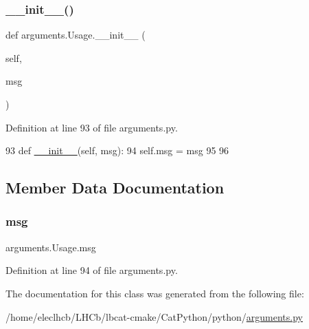 \subsubsection{\texorpdfstring{\+\_\+\+\_\+init\+\_\+\+\_\+()}{\_\_init\_\_()}}
{\footnotesize\ttfamily def arguments.\+Usage.\+\_\+\+\_\+init\+\_\+\+\_\+ (\begin{DoxyParamCaption}\item[{}]{self,  }\item[{}]{msg }\end{DoxyParamCaption})}



Definition at line 93 of file arguments.\+py.


\begin{DoxyCode}
93     \textcolor{keyword}{def }\hyperlink{classwrapper_1_1ModuleDictWrapper_a9a7a794150502f51df687831583e13b9}{\_\_init\_\_}(self, msg):
94         self.msg = msg
95 
96 \end{DoxyCode}


\subsection{Member Data Documentation}
\mbox{\label{classarguments_1_1Usage_aab69c6ee300f8e49fd5709defa9e4679}} 
\subsubsection{\texorpdfstring{msg}{msg}}
{\footnotesize\ttfamily arguments.\+Usage.\+msg}



Definition at line 94 of file arguments.\+py.



The documentation for this class was generated from the following file\+:\begin{DoxyCompactItemize}
\item 
/home/eleclhcb/\+L\+H\+Cb/lbcat-\/cmake/\+Cat\+Python/python/\hyperlink{arguments_8py}{arguments.\+py}\end{DoxyCompactItemize}
